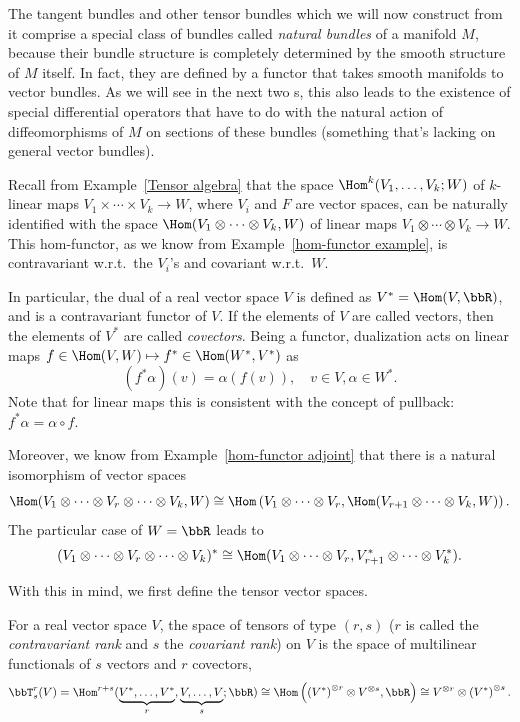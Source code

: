 The tangent bundles and other tensor bundles which we will now construct from it comprise a special class of bundles called \emph{natural bundles} of a manifold $M$, because their bundle structure is completely determined by the smooth structure of $M$ itself. In fact, they are defined by a functor that takes smooth manifolds to vector bundles. As we will see in the next two \sect s, this also leads to the existence of special differential operators that have to do with the natural action of diffeomorphisms of $M$ on sections of these bundles (something that's lacking on general vector bundles).


Recall from Example~\ref{Tensor algebra} that the space $\Hom^k(V_1,\ldots,V_k;W)$ of $k$-linear maps $V_1\times \cdots\times V_k\to W$, where $V_i$ and $F$ are vector spaces, can be naturally identified with the space $\Hom(V_1\otimes\cdots\otimes V_k,W)$ of linear maps $V_1\otimes \cdots\otimes V_k\to W$. This hom-functor, as we know from Example~\ref{hom-functor example}, is contravariant w.r.t.\ the $V_i$'s and covariant w.r.t.\ $W$. 

In particular, the dual of a real vector space $V$ is defined as $V^\ast=\Hom(V,\bbR )$, and is a contravariant functor of $V$. If the elements of $V$ are called vectors, then the elements of $V^\ast$ are called \emph{covectors}. Being a functor, dualization acts on linear maps $f\in\Hom(V,W)\mapsto f^\ast\in \Hom(W^\ast,V^\ast)$ as 
\[(f^\ast\alpha)(v)=\alpha(f(v)), \quad v\in V, \alpha\in W^\ast.\] 
Note that for linear maps this is consistent with the concept of pullback: $f^\ast\alpha=\alpha\circ f$.

Moreover, we know from Example~\ref{hom-functor adjoint} that there is a natural isomorphism of vector spaces
\[
\Hom(V_1\otimes\cdots\otimes V_r\otimes\cdots\otimes V_k,W)\cong\Hom\left(V_1\otimes\cdots\otimes V_r,\Hom(V_{r+1}\otimes\cdots\otimes V_k,W)\right).
\]
The particular case of $W=\bbR $ leads to 
\[
(V_1\otimes\cdots\otimes V_r\otimes\cdots\otimes V_k)^\ast\cong\Hom(V_1\otimes\cdots\otimes V_r,V_{r+1}^\ast\otimes\cdots\otimes V_k^\ast).
\]

With this in mind, we first define the tensor vector spaces.

\begin{defn}[Tensors]
    For a real vector space $V$, the space of tensors of type $(r,s)$ ($r$ is called the \emph{contravariant rank} and $s$ the \emph{covariant rank}) on $V$ is the space of multilinear functionals of $s$ vectors and $r$ covectors, \[\bbT^r_s(V)=\Hom^{r+s}(\underbrace{V^\ast,\ldots,V^\ast}_{r},\underbrace{V,\ldots,V}_s;\bbR )\cong\Hom \left(\left(V^\ast\right)^{\otimes r}\otimes V^{\otimes s},\bbR \right)\cong V^{\otimes r}\otimes \left(V^\ast\right)^{\otimes s}.\]
\end{defn}

